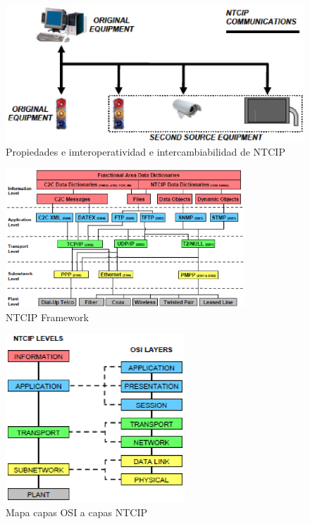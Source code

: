 \begin{figure}[H]
    \centering
    \includegraphics[width=1\textwidth]{ima/ntc_php4gbMlF}
    \caption{Propiedades e imteroperatividad e intercambiabilidad de NTCIP\cite{9}}
    \label{fig:mesh9}
\end{figure}
\begin{figure}[H]
    \centering
    \includegraphics[width=0.8\textwidth]{ima/ntc1_phpfqEM84}
    \caption{NTCIP Framework \cite{9}}
    \label{fig:mesh10}
\end{figure}
\begin{figure}[H]
    \centering
    \includegraphics[width=0.6\textwidth]{ima/ntc2_phpj0fRQP}
    \caption{Mapa capas OSI a capas NTCIP \cite{9}}
    \label{fig:mesh11}
\end{figure}
\newpage
\newpage


